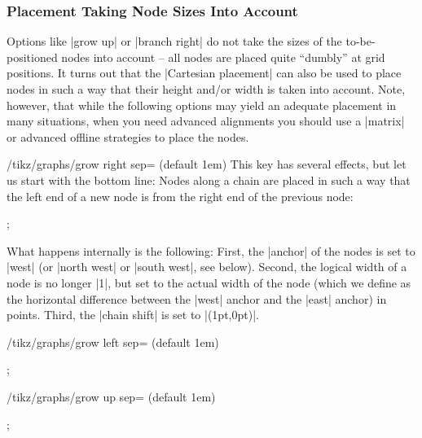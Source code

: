 \subsubsection{Placement Taking Node Sizes Into Account}

Options like |grow up| or |branch right| do not take the sizes of the
to-be-positioned nodes into account -- all nodes are placed quite ``dumbly'' at
grid positions. It turns out that the |Cartesian placement| can also be used to
place nodes in such a way that their height and/or width is taken into account.
Note, however, that while the following options may yield an adequate placement
in many situations, when you need advanced alignments you should use a |matrix|
or advanced offline strategies to place the nodes.

\begin{key}{/tikz/graphs/grow right sep= (default 1em)}
    This key has several effects, but let us start with the bottom line: Nodes
    along a chain are placed in such a way that the left end of a new node is
     from the right end of the previous node:
\begin{codeexample}[preamble={\usetikzlibrary{graphs}}]
\tikz {};
\end{codeexample}
    What happens internally is the following: First, the |anchor| of the nodes
    is set to |west| (or |north west| or |south west|, see below). Second, the
    logical width of a node is no longer |1|, but set to the actual width of
    the node (which we define as the horizontal difference between the |west|
    anchor and the |east| anchor) in points. Third, the |chain shift| is set to
    |(1pt,0pt)|.
\end{key}

\begin{key}{/tikz/graphs/grow left sep= (default 1em)}
%
\begin{codeexample}[preamble={\usetikzlibrary{graphs}}]
\tikz {};
\end{codeexample}
%
\end{key}

\begin{key}{/tikz/graphs/grow up sep= (default 1em)}
%
\begin{codeexample}[preamble={\usetikzlibrary{graphs}}]
\tikz {};
\end{codeexample}
%
\end{key}

